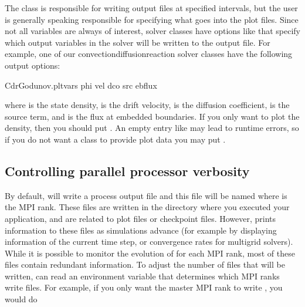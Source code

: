 \documentclass[letterpaper,10pt,english]{sphinxmanual}
\begin{document}
\sphinxAtStartPar
The {\hyperref[\detokenize{Source/Driver:chap-driver}]{}} class is responsible for writing output files at specified intervals, but the user is generally speaking responsible for specifying what goes into the plot files.
Since not all variables are always of interest, solver classes have options like  that specify which output variables in the solver will be written to the output file.
For example, one of our convection\sphinxhyphen{}diffusion\sphinxhyphen{}reaction solver classes have the following output options:

\begin{sphinxVerbatim}[commandchars=\\\{\},formatcom=\scriptsize]
CdrGodunov.plt\PYGZus{}vars  phi vel dco src ebflux 
\end{sphinxVerbatim}

\sphinxAtStartPar
where  is the state density,  is the drift velocity,  is the diffusion coefficient,  is the source term, and  is the flux at embedded boundaries.
If you only want to plot the density, then you should put .
An empty entry like  may lead to run\sphinxhyphen{}time errors, so if you do not want a class to provide plot data you may put .


\subsection{Controlling parallel processor verbosity}
\label{\detokenize{Base/Control:controlling-parallel-processor-verbosity}}
\sphinxAtStartPar
By default,  will write a process output file  and this file will be named  where  is the MPI rank.
These files are written in the directory where you executed your application, and are  related to plot files or checkpoint files.
However,  prints information to these files as simulations advance (for example by displaying information of the current time step, or convergence rates for multigrid solvers).
While it is possible to monitor the evolution of  for each MPI rank, most of these files contain redundant information.
To adjust the number of files that will be written,  can read an environment variable  that determines which MPI ranks write  files.
For example, if you only want the master MPI rank to write , you would do
\end{document}
